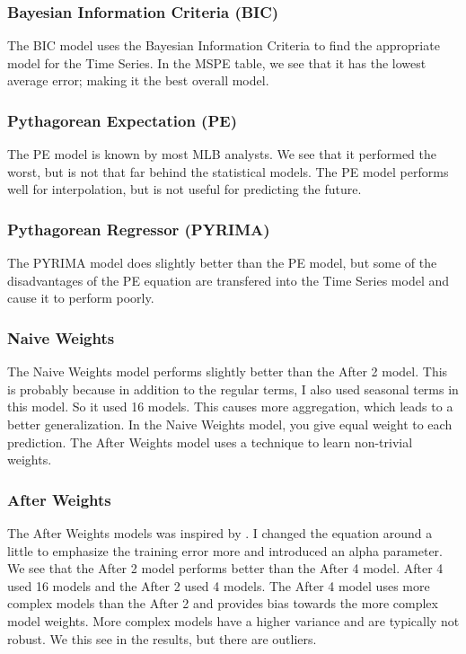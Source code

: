 \documentclass[12pt,a4paper,man,natbib]{apa6}
\begin{document}
\subsubsection{Bayesian Information Criteria (BIC)}

The BIC model uses the Bayesian Information Criteria to find 
the appropriate model for the Time Series. In the MSPE 
table, we see that it has the lowest average error; making 
it the best overall model.

\subsubsection{Pythagorean Expectation (PE)}

The PE model is known by most MLB analysts. We 
see that it performed the worst, but is not that far behind 
the statistical models. The PE model performs well for 
interpolation, but is not useful for predicting the future.

\subsubsection{Pythagorean Regressor (PYRIMA)}

The PYRIMA model does slightly better than the PE model, but 
some of the disadvantages of the PE equation are transfered 
into the Time Series model and cause it to perform poorly.

\subsubsection{Naive Weights}

The Naive Weights model performs slightly better than the 
After 2 model. This is probably because in addition to the 
regular terms, I also used seasonal terms in this model. So 
it used 16 models. This causes more aggregation, which leads 
to a better generalization. In the Naive Weights model, you 
give equal weight to each prediction. The After Weights 
model uses a technique to learn non-trivial weights.

\subsubsection{After Weights}

The After Weights models was inspired by \cite{after}. I 
changed the equation around a little to emphasize the 
training error more and introduced an alpha parameter. We 
see that the After 2 model performs better than the After 4 
model. After 4 used 16 models and the After 2 used 4 models. 
The After 4 model uses more complex models than the After 2 
and provides bias towards the more complex model weights. 
More complex models have a higher variance and are typically 
not robust. We this see in the results, but there are 
outliers.
\end{document}
